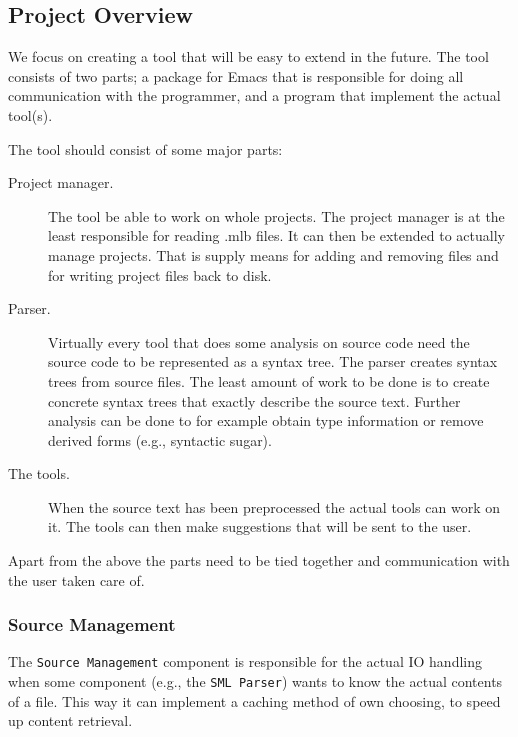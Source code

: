 \documentclass[a4paper,oneside]{memoir}
\begin{document}


\subsection{Project Overview}
We focus on creating a tool that will be easy to extend in the
future. The tool consists of two parts; a package for Emacs that is
responsible for doing all communication with the programmer, and a
program that implement the actual tool(s).

The tool should consist of some major parts:
\begin{description}
\item[Project manager.] The tool be able to work on whole
  projects. The project manager is at the least responsible for
  reading .mlb files. It can then be extended to actually manage
  projects. That is supply means for adding and removing files and for
  writing project files back to disk.
\item[Parser.] Virtually every tool that does some analysis on source
  code need the source code to be represented as a syntax tree. The
  parser creates syntax trees from source files. The least amount of
  work to be done is to create concrete syntax trees that exactly
  describe the source text. Further analysis can be done to for
  example obtain type information or remove derived forms (e.g.,
  syntactic sugar).
\item[The tools.] When the source text has been preprocessed the
  actual tools can work on it. The tools can then make suggestions
  that will be sent to the user.
\end{description}

Apart from the above the parts need to be tied together and
communication with the user taken care of.


\subsubsection{Source Management}


The \texttt{Source Management} component is responsible for the actual
IO handling when some component (e.g., the \texttt{SML Parser}) wants
to know the actual contents of a file. This way it can implement a
caching method of own choosing, to speed up content retrieval.
\end{document}
